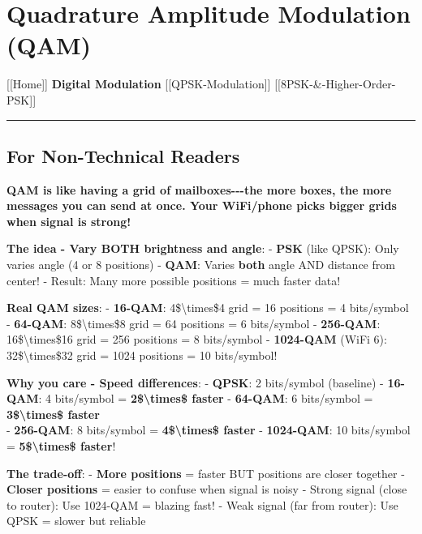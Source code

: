 \section{Quadrature Amplitude Modulation
(QAM)}\label{quadrature-amplitude-modulation-qam}

{[}{[}Home{]}{]} \textbar{} \textbf{Digital Modulation} \textbar{}
{[}{[}QPSK-Modulation{]}{]} \textbar{}
{[}{[}8PSK-\&-Higher-Order-PSK{]}{]}

\begin{center}\rule{0.5\linewidth}{0.5pt}\end{center}

\subsection{\texorpdfstring{ For Non-Technical
Readers}{ For Non-Technical Readers}}\label{for-non-technical-readers}

\textbf{QAM is like having a grid of mailboxes-\/-\/-the more boxes, the
more messages you can send at once. Your WiFi/phone picks bigger grids
when signal is strong!}

\textbf{The idea - Vary BOTH brightness and angle}: - \textbf{PSK} (like
QPSK): Only varies angle (4 or 8 positions) - \textbf{QAM}: Varies
\textbf{both} angle AND distance from center! - Result: Many more
possible positions = much faster data!

\textbf{Real QAM sizes}: - \textbf{16-QAM}: 4\$\textbackslash times\$4
grid = 16 positions = 4 bits/symbol - \textbf{64-QAM}:
8\$\textbackslash times\$8 grid = 64 positions = 6 bits/symbol -
\textbf{256-QAM}: 16\$\textbackslash times\$16 grid = 256 positions = 8
bits/symbol - \textbf{1024-QAM} (WiFi 6): 32\$\textbackslash times\$32
grid = 1024 positions = 10 bits/symbol!

\textbf{Why you care - Speed differences}: - \textbf{QPSK}: 2
bits/symbol (baseline) - \textbf{16-QAM}: 4 bits/symbol =
\textbf{2\$\textbackslash times\$ faster} - \textbf{64-QAM}: 6
bits/symbol = \textbf{3\$\textbackslash times\$ faster}\\
- \textbf{256-QAM}: 8 bits/symbol = \textbf{4\$\textbackslash times\$
faster} - \textbf{1024-QAM}: 10 bits/symbol =
\textbf{5\$\textbackslash times\$ faster}!

\textbf{The trade-off}: - \textbf{More positions} = faster BUT positions
are closer together - \textbf{Closer positions} = easier to confuse when
signal is noisy - Strong signal (close to router): Use 1024-QAM =
blazing fast! - Weak signal (far from router): Use QPSK = slower but
reliable

